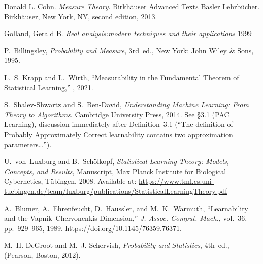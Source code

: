 \begin{thebibliography}{999}

    Donald L. Cohn.
    \textit{Measure Theory}.
    Birkhäuser Advanced Texts Basler Lehrbücher.
    Birkhäuser, New York, NY, second edition, 2013.

    Golland, Gerald B.
    \textit{Real analysis:modern techniques and their applications}
    1999

    P.~Billingsley, \emph{Probability and Measure}, 3rd~ed., New York: John Wiley \& Sons, 1995.

    L.~S. Krapp and L.~Wirth,
    \newblock ``Measurability in the Fundamental Theorem of Statistical Learning,''
    , 2021.

    S.~Shalev\hyp{}Shwartz and S.~Ben\hyp{}David,
    \emph{Understanding Machine Learning: From Theory to Algorithms}.
    Cambridge University Press, 2014.
    See \S3.1 (PAC Learning), discussion immediately after Definition~3.1
    (“The definition of Probably Approximately Correct learnability contains two approximation parameters…”).

    U.~von~Luxburg and B.~Sch{\"o}lkopf,
    \emph{Statistical Learning Theory: Models, Concepts, and Results},
    Manuscript, Max Planck Institute for Biological Cybernetics, T{\"u}bingen, 2008.
    Available at: \url{https://www.tml.cs.uni-tuebingen.de/team/luxburg/publications/StatisticalLearningTheory.pdf}

    A.~Blumer, A.~Ehrenfeucht, D.~Haussler, and M.~K.~Warmuth,
    ``Learnability and the Vapnik--Chervonenkis Dimension,''
    \emph{J. Assoc. Comput. Mach.}, vol.~36, pp.~929--965, 1989.
    \url{https://doi.org/10.1145/76359.76371}.

    M.~H. DeGroot and M.~J. Schervish, \textit{Probability and Statistics}, 4th~ed., (Pearson, Boston, 2012).


%
%
%
%


\end{thebibliography}
